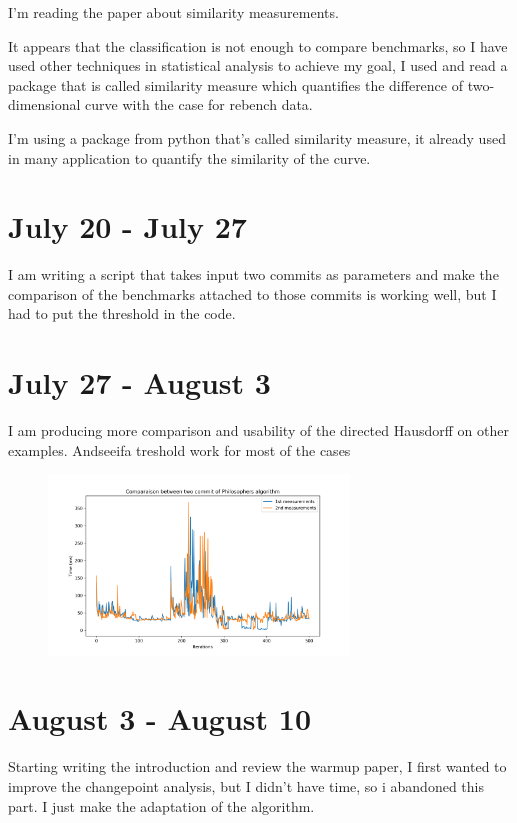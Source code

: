 \documentclass[12pt,a4paper]{article}
\begin{document}
I'm reading the paper about similarity measurements.

It appears that the classification is not enough to compare benchmarks, so I have used other techniques in statistical analysis to achieve my goal, I used and read a package that is called similarity measure which quantifies the difference of two-dimensional curve with the case for rebench data.

I'm using a package from python that's called similarity measure, it already used in many application to quantify the similarity of the curve.

\section{July 20 - July 27}

I am writing a script that takes input two commits as parameters and make the comparison of the benchmarks attached to those commits is working well, but I had to put the threshold in the code.


\section{July 27 - August 3}

I am producing more comparison and usability of the directed Hausdorff on other examples.
Andseeifa treshold work for most of the cases



\begin{figure}[h]
\includegraphics[width=8cm]{assets/plot_Philosophers_42.533000000000015.png}
\end{figure}


\section{August 3 - August 10}

Starting writing the introduction and review the warmup paper, I first wanted to improve the changepoint analysis, but I didn't have time, so i abandoned this part. I just make the adaptation of the algorithm.
\end{document}

